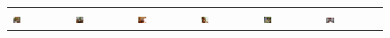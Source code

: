 \begin{figure}[t!]
\begin{tabular}{*{6}{C{0.13\textwidth}}}
  \includegraphics[height=0.12\textwidth,width=0.15\textwidth]{chair_pos_000234.pdf}&
  \includegraphics[height=0.12\textwidth,width=0.15\textwidth]{chair_pos_000008.pdf}&
  \includegraphics[height=0.12\textwidth,width=0.15\textwidth]{chair_neg_000006.pdf}&
  \includegraphics[height=0.12\textwidth,width=0.15\textwidth]{person_pos_000664.pdf}&
  \includegraphics[height=0.12\textwidth,width=0.15\textwidth]{person_pos_000421.pdf}&
  \includegraphics[height=0.12\textwidth,width=0.15\textwidth]{person_neg_000090.pdf}\\[-2ex]
  

\end{tabular}
\end{figure}
